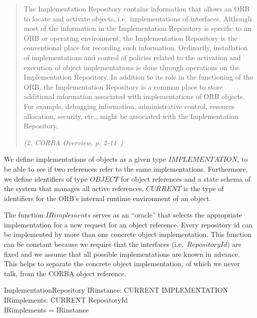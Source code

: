 \begin{quote}
  The Implementation Repository contains information that allows an ORB to
  locate and activate objects, i.e.\ implementations of interfaces. Although
  most of the information in the Implementation Repository is specific to an ORB
  or operating environment, the Implementation Repository is the conventional
  place for recording such information.  Ordinarily, installation of
  implementations and control of policies related to the activation and
  execution of object implementations is done through operations on the
  Implementation Repository.  In addition to its role in the functioning of the
  ORB, the Implementation Repository is a common place to store additional
  information associated with implementations of ORB objects. For example,
  debugging information, administrative control, resource allocation, security,
  etc., might be associated with the Implementation Repository.

  \hspace*{\fill}\emph{(2. CORBA Overview, p. 2-11~\cite{omg:CORBA:2.4:2000})}
\end{quote}


We define implementations of objects as a given type $IMPLEMENTATION$, to be
able to see if two references refer to the same implementations.  Furthermore,
we define identifiers of type $OBJECT$ for object references and a state schema
of the system that manages all active references.  $CURRENT$ is the type of
identifiers for the ORB's internal runtime environment of an object.
   
\begin{zed}
\end{zed}
The function $IRimplements$ serves as an ``oracle'' that selects the appropriate
implementation for a new request for an object reference.  Every repository id
can be implemented by more than one concrete object implementation.  This
function can be constant because we require that the interfaces (i.e.\ 
$RepositoryId$) are fixed and we assume that all possible implementations are
known in advance.  This helps to separate the concrete object implementation, of
which we never talk, from the CORBA object reference.
\begin{schema}{ImplementationRepository}
  IRinstance: CURRENT \pfun IMPLEMENTATION \\ 
  IRimplements: CURRENT \pfun RepositoryId \\
  \where
  \dom IRimplements = \dom IRinstance \\
\end{schema}


